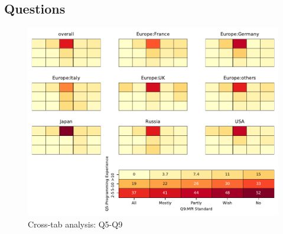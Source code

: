 
\subsection{Questions}


\begin{figure}
\begin{center}
\includegraphics[width=12cm]{../pdfs/Q5-Q9.pdf}
\caption{Cross-tab analysis: Q5-Q9}
\label{fig:Q5-Q9}
\end{center}
\end{figure}
